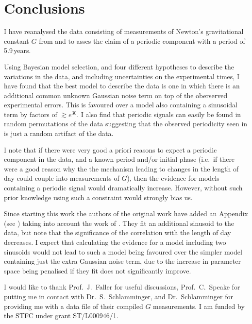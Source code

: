 \documentclass[comment]{epl2}
\begin{document}
\section{Conclusions}

I have reanalysed the data consisting of measurements of Newton's gravitational constant $G$ from
\cite{2015EL....11010002A} and \cite{2015arXiv150501774S} to asses the claim of a periodic
component with a period of 5.9\,years.

Using Bayesian model selection, and four different hypotheses to describe the variations in the data, and including
uncertainties on the experimental times, I have found that the best model to describe the data is one in which
there is an additional common unknown Gaussian noise term on top of the oberserved experimental errors. This is 
favoured over a model also containing a sinusoidal term by factors of $\gtrsim e^{30}$. I also find that periodic
signals can easily be found in random permutations of the data suggesting that the observed periodicity seen in
\cite{2015EL....11010002A} is just a random artifact of the data.

I note that if there were very good a priori reasons to expect a periodic component in the data, and a known
period and/or initial phase (i.e.\ if there were a good reason why the the mechanism leading to changes in the
length of day could couple into measurements of $G$), then the evidence for models containing a periodic
signal would dramatically increase. However, without such prior knowledge using such a constraint would strongly bias
us.

Since starting this work the authors of the original work have added an Appendix (see \cite{AndersonRevised}) taking
into account the work of \cite{2015arXiv150501774S}. They fit an additional sinusoid to the data, but note that the
significance of the correlation with the length of day decreases. I expect that calculating the evidence for a model
including two sinusoids would not lead to such a model being favoured over the simpler model containing just the
extra Gaussian noise term, due to the increase in parameter space being penalised if they fit does not significantly
improve.

\acknowledgements

I would like to thank Prof.\ J.\ Faller for useful discussions, Prof.\ C.\ Speake for putting me in contact with
Dr.\ S.\ Schlamminger, and Dr.\ Schlamminger for providing me with a data file of their compiled $G$ measurements.
I am funded by the STFC under grant ST/L000946/1.



\end{document}
